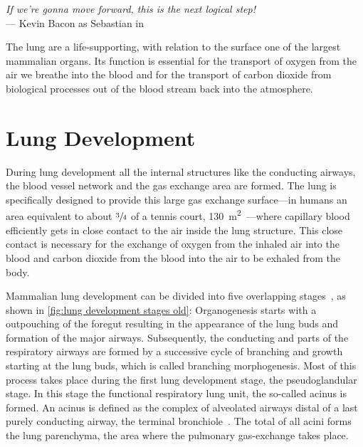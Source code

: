 \acresetall
{}\label{ch:lung}
\begin{flushright}{\slshape If we're gonna move forward, this is the next logical step!} \\ \medskip
	--- Kevin Bacon as Sebastian in \citep{HollowMan}
\end{flushright}
\vspace{74mm}

The lung are a life-supporting, with relation to the surface one of the largest mammalian organs. Its function is essential for the transport of oxygen from the air we breathe into the blood and for the transport of carbon dioxide from biological processes out of the blood stream back into the atmosphere.

\section{Lung Development}
During lung development all the internal structures like the conducting airways, the blood vessel network and the gas exchange area are formed. The lung is specifically designed to provide this large gas exchange surface---in humans an area equivalent to about $\sfrac{3}{4}$ of a tennis court, \SI{130}{\meter\squared}~\cite{Weibel2009}---where capillary blood efficiently gets in close contact to the air inside the lung structure. This close contact is necessary for the exchange of oxygen from the inhaled air into the blood and carbon dioxide from the blood into the air to be exhaled from the body.

Mammalian lung development can be divided into five overlapping stages~\cite{Schittny2004,Schittny2007a}, as shown in \autoref{fig:lung development stages old}: Organogenesis starts with a outpouching of the foregut resulting in the appearance of the lung buds and formation of the major airways. Subsequently, the conducting and parts of the respiratory airways are formed by a successive cycle of branching and growth starting at the lung buds, which is called branching morphogenesis. Most of this process takes place during the first lung development stage, the pseudoglandular stage. In this stage the functional respiratory lung unit, the so-called acinus is formed. An acinus is defined as the complex of alveolated airways distal of a last purely conducting airway, the terminal bronchiole~\cite{Rodriguez1987}. The total of all acini forms the lung parenchyma, the area where the pulmonary gas-exchange takes place.

